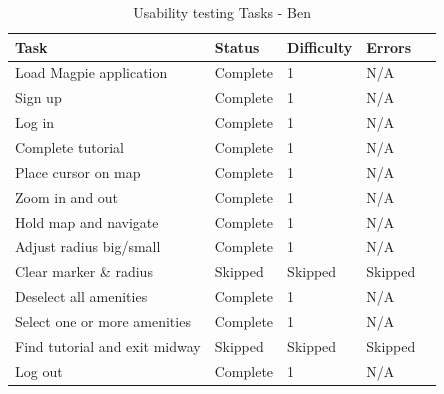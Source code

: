 \begin{table}[h!]
    \centering
    \caption{Usability testing Tasks - Ben}
    \begin{tabular}{|p{}|p{}|p{}|p{}|p{}|}
        \hline
        \textbf{Task}                 & \textbf{Status} & \textbf{Difficulty} & \textbf{Errors} \\
        \hline
        Load Magpie application       & Complete        & 1                   & N/A             \\
        \hline
        Sign up                       & Complete        & 1                   & N/A             \\
        \hline
        Log in                        & Complete        & 1                   & N/A             \\
        \hline
        Complete tutorial             & Complete        & 1                   & N/A             \\
        \hline
        Place cursor on map           & Complete        & 1                   & N/A             \\
        \hline
        Zoom in and out               & Complete        & 1                   & N/A             \\
        \hline
        Hold map and navigate         & Complete        & 1                   & N/A             \\
        \hline
        Adjust radius big/small       & Complete        & 1                   & N/A             \\
        \hline
        Clear marker \& radius        & Skipped         & Skipped             & Skipped         \\
        \hline
        Deselect all amenities        & Complete        & 1                   & N/A             \\
        \hline
        Select one or more amenities  & Complete        & 1                   & N/A             \\
        \hline
        Find tutorial and exit midway & Skipped         & Skipped             & Skipped         \\
        \hline
        Log out                       & Complete        & 1                   & N/A             \\
        \hline
    \end{tabular}
\end{table}


